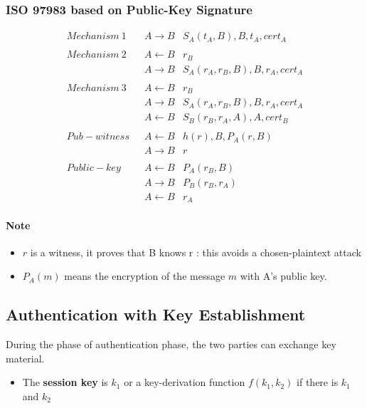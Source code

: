 \subsubsection{ISO 9798\text{-}3 based on Public-Key Signature}
\begin{eqnarray*}
    Mechanism~1 \quad & A \rightarrow B & S_A(t_A,B),B,t_A,cert_A \\
    \\
    Mechanism~2 \quad & A \leftarrow B & r_B\\
                      & A \rightarrow B &
    S_A(r_A,r_B,B),B,r_A,cert_A \\
    \\
    Mechanism~3 \quad & A \leftarrow B & r_B \\
                      & A \rightarrow B &
    S_A(r_A,r_B,B),B,r_A,cert_A \\
    & A \leftarrow B & S_B(r_B, r_A, A), A, cert_B \\
    \\
    Pub-witness & A \leftarrow B & h(r), B, P_A(r, B) \\
    & A \rightarrow B & r \\
    \\
    Public-key & A \leftarrow B & P_A(r_B, B) \\
                                    & A \rightarrow B & P_B(r_B, r_A)\\
                                    & A \leftarrow B & r_A
\end{eqnarray*}

\paragraph{Note} 
\begin{itemize}
    \item $r$ is a witness, it proves that B knows r : this avoids a
        chosen-plaintext attack
    \item $P_A(m)$ means the
        encryption of the message $m$ with A’s public key.
\end{itemize}


\subsection{Authentication with Key Establishment}
During the phase of authentication phase, the two parties can exchange key
material.

\begin{itemize}
    \item The \textbf{session key} is $k_1$ or a key-derivation function  
        $f(k_1,k_2)$ if there is $k_1$ and $k_2$
\end{itemize}

